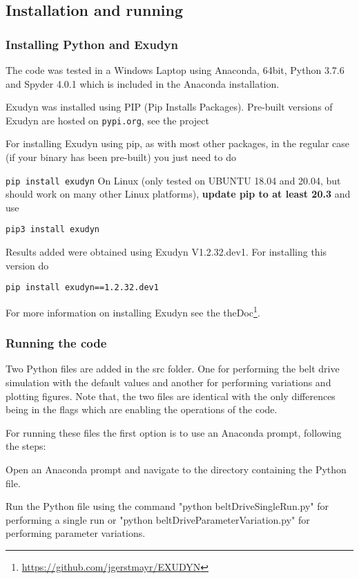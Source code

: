 \ei
\subsection{Installation and running}
\subsubsection{Installing Python and Exudyn}
\label{installationInstructions}
The code was tested in a Windows Laptop using Anaconda, 64bit, Python 3.7.6 and Spyder 4.0.1 which is included in the Anaconda installation.

Exudyn was installed using PIP (Pip Installs Packages).
Pre-built versions of Exudyn are hosted on \texttt{pypi.org}, see the project
\bi
 \item {}
\ei
For installing Exudyn using pip, as with most other packages, in the regular case (if your binary has been pre-built) you just need to do
\bi
  \item[] \texttt{pip install exudyn}
\ei
On Linux (only tested on UBUNTU 18.04 and 20.04, but should work on many other Linux platforms), {\bf update pip to at least 20.3} and use 
\bi
  \item[] \texttt{pip3 install exudyn}
\ei

Results added  
were obtained using Exudyn V1.2.32.dev1. For installing this version do
\bi
  \item[] \texttt{pip install exudyn==1.2.32.dev1}
\ei
             
For more information on installing Exudyn see the theDoc\footnote{\url{https://github.com/jgerstmayr/EXUDYN}}.
\subsubsection{Running the code}
Two Python files are added in the src folder. One for performing the belt drive simulation with the default values and another for performing variations and plotting figures. Note that, the two files are identical with the only differences being in the flags which are enabling the operations of the code.
 
For running these files the first option is to use an Anaconda prompt, following the steps:
\bi
\item Open an Anaconda prompt and navigate to the directory containing the Python file. %
\item Run the Python file using the command "python beltDriveSingleRun.py" for performing a single run or "python beltDriveParameterVariation.py" for performing parameter variations. 
\ei

